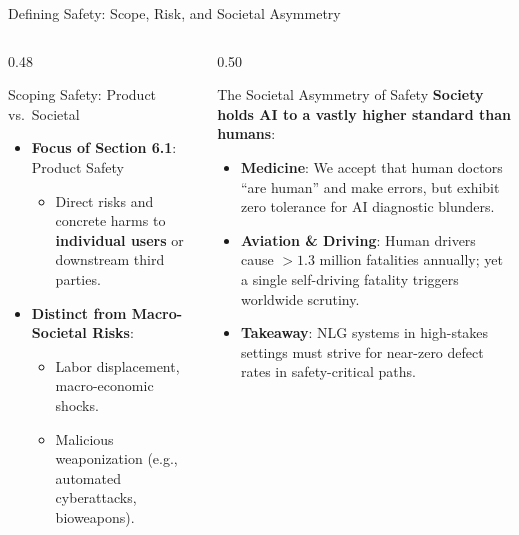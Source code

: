 \documentclass[aspectratio=169, 10pt]{beamer}
\begin{document}
\begin{frame}{Defining Safety: Scope, Risk, and Societal Asymmetry}
  \begin{columns}[T]
    \begin{column}{0.48\textwidth}
      \begin{block}{Scoping Safety: Product vs.\ Societal}
        \begin{itemize}
          \item \textbf{Focus of Section 6.1}: \alert{Product Safety}
          \begin{itemize}
            \item Direct risks and concrete harms to \textbf{individual users} or downstream third parties.
          \end{itemize}
          \item \textbf{Distinct from Macro-Societal Risks}:
          \begin{itemize}
            \item Labor displacement, macro-economic shocks.
            \item Malicious weaponization (e.g., automated cyberattacks, bioweapons).
          \end{itemize}
        \end{itemize}
      \end{block}
    \end{column}

    \begin{column}{0.50\textwidth}
      \begin{block}{The Societal Asymmetry of Safety}
        \textbf{Society holds AI to a vastly higher standard than humans}:
        \begin{itemize}
          \item \textbf{Medicine}: We accept that human doctors ``are human'' and make errors, but exhibit zero tolerance for AI diagnostic blunders.
          \item \textbf{Aviation \& Driving}: Human drivers cause $>1.3$ million fatalities annually; yet a single self-driving fatality triggers worldwide scrutiny.
          \item \textbf{Takeaway}: NLG systems in high-stakes settings must strive for near-zero defect rates in safety-critical paths.
        \end{itemize}
      \end{block}
    \end{column}
  \end{columns}
\end{frame}
\end{document}
